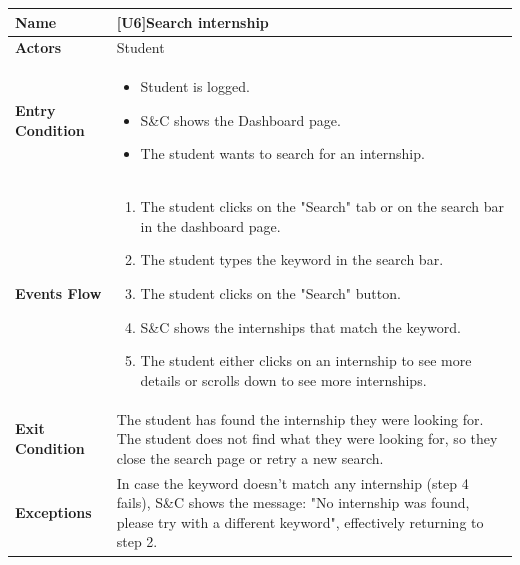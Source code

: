 \begin{center}
    \begin{tabular}{|p{9em}|p{27em}|}
        \hline
        \rowcolor{bluepoli!40} %
        \textbf{Name} & \textbf{[U6]Search internship} \\
        \hline
        \textbf{Actors} & Student \\
        \hline
        \textbf{Entry Condition} &  
        \begin{itemize}
            \item Student is logged.
            \item S\&C shows the Dashboard page.
            \item The student wants to search for an internship.
        \end{itemize} \\
        \hline
        \textbf{Events Flow} & 
        \begin{enumerate}
            \item The student clicks on the "Search" tab or on the search bar in the dashboard page.
            \item The student types the keyword in the search bar.
            \item The student clicks on the "Search" button.
            \item S\&C shows the internships that match the keyword.
            \item The student either clicks on an internship to see more details or scrolls down to see more internships.
        \end{enumerate} \\
        \hline
        \textbf{Exit Condition} & The student has found the internship they were looking for. The student does not find what they were looking for,
        so they close the search page or retry a new search. \\
        \hline
        \textbf{Exceptions} & In case the keyword doesn't match any internship (step 4 fails), S\&C shows the message: "No internship was found,
        please try with a different keyword", effectively returning to step 2. \\
        \hline
    \end{tabular}
\end{center}

